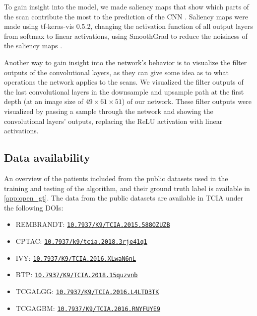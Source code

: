 To gain insight into the model, we made saliency maps that show which parts of the scan contribute the most to the prediction of the \gls{CNN} \autocite{smilkov2017smoothgrad}.
Saliency maps were made using tf-keras-vis 0.5.2, changing the activation function of all output layers from softmax to linear activations, using SmoothGrad to reduce the noisiness of the saliency maps \autocite{smilkov2017smoothgrad}.

Another way to gain insight into the network's behavior is to visualize the filter outputs of the convolutional layers, as they can give some idea as to what operations the network applies to the scans.
We visualized the filter outputs of the last convolutional layers in the downsample and upsample path at the first depth (at an image size of $49\times61\times51$) of our network.
These filter outputs were visualized by passing a sample through the network and showing the convolutional layers' outputs, replacing the ReLU activation with linear activations.

\subsection{Data availability}
An overview of the patients included from the public datasets used in the training and testing of the algorithm, and their ground truth label is available in \cref{app:open_gt}.
The data from the public datasets are available in \gls{TCIA} under the following DOIs:

\begin{itemize}
    \item \gls{REMBRANDT}: \href{https://dx.doi.org/10.7937/K9/TCIA.2015.588OZUZB}{\texttt{10.7937/K9/TCIA.2015.588OZUZB}}
    \item \gls{CPTAC}: \href{https://dx.doi.org/10.7937/k9/tcia.2018.3rje41q1}{\texttt{10.7937/k9/tcia.2018.3rje41q1}}
    \item \gls{IVY}: \href{https://dx.doi.org/10.7937/K9/TCIA.2016.XLwaN6nL}{\texttt{10.7937/K9/TCIA.2016.XLwaN6nL}}
    \item \gls{BTP}: \href{https://dx.doi.org/10.7937/K9/TCIA.2018.15quzvnb}{\texttt{10.7937/K9/TCIA.2018.15quzvnb}}
    \item \gls{TCGALGG}: \href{https://dx.doi.org/10.7937/K9/TCIA.2016.L4LTD3TK}{\texttt{10.7937/K9/TCIA.2016.L4LTD3TK}}
    \item \gls{TCGAGBM}: \href{https://dx.doi.org/10.7937/K9/TCIA.2016.RNYFUYE9}{\texttt{10.7937/K9/TCIA.2016.RNYFUYE9}}

\end{itemize}

